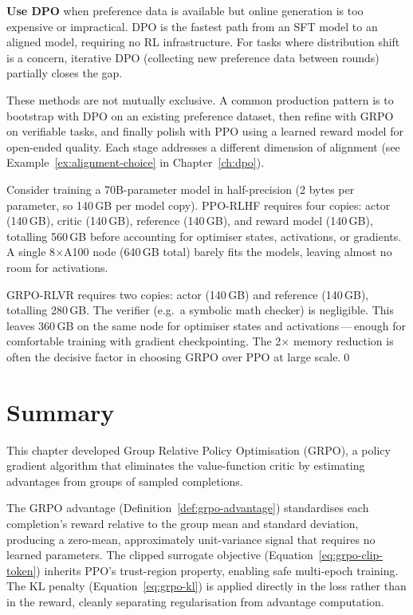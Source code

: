 \textbf{Use DPO} when preference data is available but online generation is too expensive or impractical.  DPO is the fastest path from an SFT model to an aligned model, requiring no RL infrastructure.  For tasks where distribution shift is a concern, iterative DPO (collecting new preference data between rounds) partially closes the gap.

\begin{remark}
These methods are not mutually exclusive.  A common production pattern is to bootstrap with DPO on an existing preference dataset, then refine with GRPO on verifiable tasks, and finally polish with PPO using a learned reward model for open-ended quality.  Each stage addresses a different dimension of alignment (see Example~\ref{ex:alignment-choice} in Chapter~\ref{ch:dpo}).
\end{remark}

\begin{example}
\label{ex:grpo-memory}
Consider training a 70B-parameter model in half-precision (2 bytes per parameter, so 140\,GB per model copy).  PPO-RLHF requires four copies: actor (140\,GB), critic (140\,GB), reference (140\,GB), and reward model (140\,GB), totalling 560\,GB before accounting for optimiser states, activations, or gradients.  A single 8$\times$A100 node (640\,GB total) barely fits the models, leaving almost no room for activations.

GRPO-RLVR requires two copies: actor (140\,GB) and reference (140\,GB), totalling 280\,GB.  The verifier (e.g.\ a symbolic math checker) is negligible.  This leaves 360\,GB on the same node for optimiser states and activations\,---\,enough for comfortable training with gradient checkpointing.  The 2$\times$ memory reduction is often the decisive factor in choosing GRPO over PPO at large scale.\qed
\end{example}

\section{Summary}
\label{sec:grpo-summary}

This chapter developed Group Relative Policy Optimisation (GRPO), a policy gradient algorithm that eliminates the value-function critic by estimating advantages from groups of sampled completions.

The GRPO advantage (Definition~\ref{def:grpo-advantage}) standardises each completion's reward relative to the group mean and standard deviation, producing a zero-mean, approximately unit-variance signal that requires no learned parameters.  The clipped surrogate objective (Equation~\eqref{eq:grpo-clip-token}) inherits PPO's trust-region property, enabling safe multi-epoch training.  The KL penalty (Equation~\eqref{eq:grpo-kl}) is applied directly in the loss rather than in the reward, cleanly separating regularisation from advantage computation.

